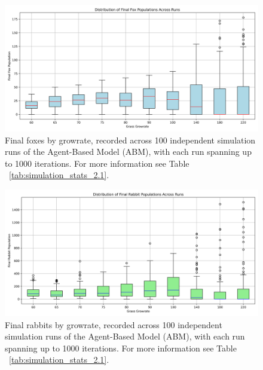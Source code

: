 \begin{figure}[!ht]
  \centering
  \includegraphics[width=0.9\linewidth]{images/boxplot_final_foxes_by_growrate_100.png}
  \caption{
    Final foxes by growrate, recorded across 100 independent simulation runs of the Agent-Based Model (ABM), with each run spanning up to 1000 iterations. For more information see Table ~\ref{tab:simulation_stats_2.1}.
}
  \label{fig:boxplot_final_foxes_by_growrate_100_2.1}
\end{figure}





\begin{figure}[!ht]
  \centering
  \includegraphics[width=0.9\linewidth]{images/boxplot_final_rabbits_by_growrate_100.png}
  \caption{
    Final rabbits by growrate, recorded across 100 independent simulation runs of the Agent-Based Model (ABM), with each run spanning up to 1000 iterations. For more information see Table ~\ref{tab:simulation_stats_2.1}.
}
  \label{fig:boxplot_final_rabbits_by_growrate_100_2.1}
\end{figure}


